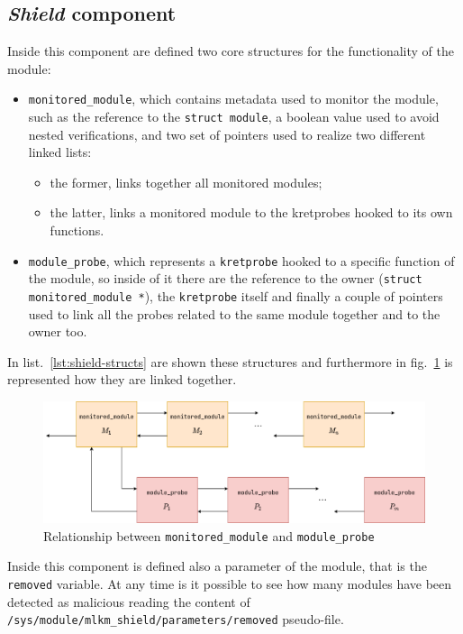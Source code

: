 \documentclass{article}
\begin{document}
	\subsection{\emph{Shield} component}\label{sec:shield}
	Inside this component are defined two core structures for the functionality of the module:
	\begin{itemize}
		\item \texttt{monitored\_module}, which contains metadata used to monitor the module, such as the reference to
		the \texttt{struct module}, a boolean value used to avoid nested verifications, and two set of pointers used to
		realize two different linked lists:
		\begin{itemize}
			\item the former, links together all monitored modules;
			\item the latter, links a monitored module to the kretprobes hooked to its own functions.
		\end{itemize}

		\item \texttt{module\_probe}, which represents a \texttt{kretprobe} hooked to a specific function of the module,
		so inside of it there are the reference to the owner (\texttt{struct monitored\_module *}), the
		\texttt{kretprobe} itself and finally a couple of pointers used to link all the probes related to the same
		module together and to the owner too.
	\end{itemize}

	In list.~\ref{lst:shield-structs} are shown these structures and furthermore in fig.~\ref{fig:shield-structs} is
	represented how they are linked together.

	\begin{figure}[!htbp]
		\centering
		\includegraphics[scale=0.4]{shield-structs}
		\caption{Relationship between \texttt{monitored\_module} and \texttt{module\_probe}}
		\label{fig:shield-structs}
	\end{figure}

	Inside this component is defined also a parameter of the module, that is the \texttt{removed} variable. At any time
	is it possible to see how many modules have been detected as malicious reading the content of
	\texttt{/sys/module/mlkm\_shield/parameters/removed} pseudo-file.
\end{document}
